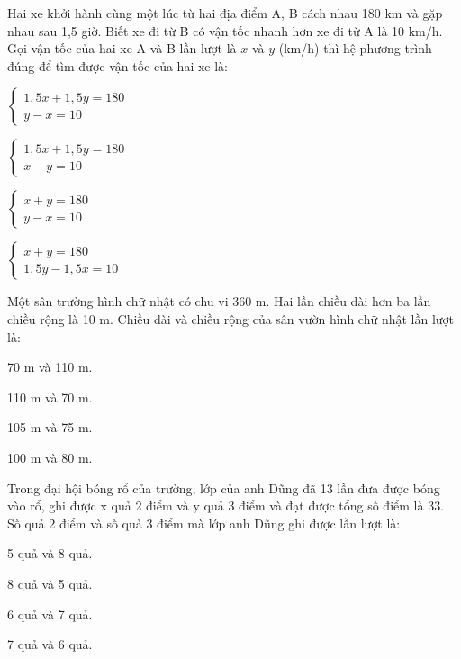 \documentclass[%
    fontsize=12pt,%
    chapterprefix=false,%
    open=right,%
    twoside=false,%
    numbers=noenddot,%
    headings=optiontohead,%
    final,%
    DIV=15,%
    parskip=half %
]{scrbook}
\begin{document}
\begin{tracnghiem}
\item Hai xe khởi hành cùng một lúc từ hai địa điểm A, B cách nhau 180 km và gặp nhau sau 1,5 giờ. Biết xe đi từ B có vận tốc nhanh hơn xe đi từ A là 10 km/h. Gọi vận tốc của hai xe A và B lần lượt là $ x $ và $ y $ (km/h) thì hệ phương trình đúng để tìm được vận tốc của hai xe là:
\begin{options}
  \item $ \begin{cases} 1,5x + 1,5y = 180 \\ y - x = 10 \end{cases} $
  \item $ \begin{cases} 1,5x + 1,5y = 180 \\ x - y = 10 \end{cases} $
  \item $ \begin{cases} x + y = 180 \\ y - x = 10 \end{cases} $
  \item $ \begin{cases} x + y = 180 \\ 1,5y - 1,5x = 10 \end{cases} $
\end{options}

\item Một sân trường hình chữ nhật có chu vi 360 m. Hai lần chiều dài hơn ba lần chiều rộng là 10 m. Chiều dài và chiều rộng của sân vườn hình chữ nhật lần lượt là:
\begin{options}
  \item 70 m và 110 m.
  \item 110 m và 70 m.
  \item 105 m và 75 m.
  \item 100 m và 80 m.
\end{options}

\item Trong đại hội bóng rổ của trường, lớp của anh Dũng đã 13 lần đưa được bóng vào rổ, ghi được x quả 2 điểm và y quả 3 điểm và đạt được tổng số điểm là 33. Số quả 2 điểm và số quả 3 điểm mà lớp anh Dũng ghi được lần lượt là:
\begin{options}
  \item 5 quả và 8 quả.
  \item 8 quả và 5 quả.
  \item 6 quả và 7 quả.
  \item 7 quả và 6 quả.
\end{options}


\end{tracnghiem}
\end{document}
